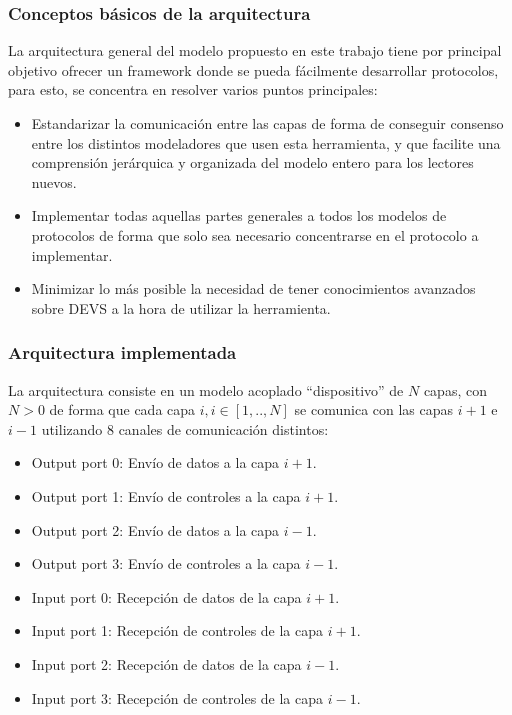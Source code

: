 \documentclass[10pt,a4paper]{article}
\begin{document}
\subsubsection{Conceptos básicos de la arquitectura}

La arquitectura general del modelo propuesto en este trabajo tiene por principal objetivo ofrecer un framework donde se pueda fácilmente desarrollar protocolos, para esto, se concentra en resolver varios puntos principales:

\begin{itemize}
\item Estandarizar la comunicación entre las capas de forma de conseguir consenso entre los distintos modeladores que usen esta herramienta, y que facilite una comprensión jerárquica y organizada del modelo entero para los lectores nuevos.
\item Implementar todas aquellas partes generales a todos los modelos de protocolos de forma que solo sea necesario concentrarse en el protocolo a implementar.
\item Minimizar lo más posible la necesidad de tener conocimientos avanzados sobre DEVS a la hora de utilizar la herramienta.
\end{itemize}

\newpage

\subsubsection{Arquitectura implementada}
La arquitectura consiste en un modelo acoplado ``dispositivo'' de $N$ capas, con $N > 0$ de forma que cada capa $i, i \in [1,..,N]$ se comunica con las capas $i+1$ e $i-1$ utilizando $8$ canales de comunicación distintos:

\begin{itemize}
\item Output port 0: Envío de datos a la capa $i+1$.
\item Output port 1: Envío de controles a la capa $i+1$.
\item Output port 2: Envío de datos a la capa $i-1$.
\item Output port 3: Envío de controles a la capa $i-1$.
\item Input port 0: Recepción de datos de la capa $i+1$.
\item Input port 1: Recepción de controles de la capa $i+1$.
\item Input port 2: Recepción de datos de la capa $i-1$.
\item Input port 3: Recepción de controles de la capa $i-1$.
\end{itemize}
\end{document}
